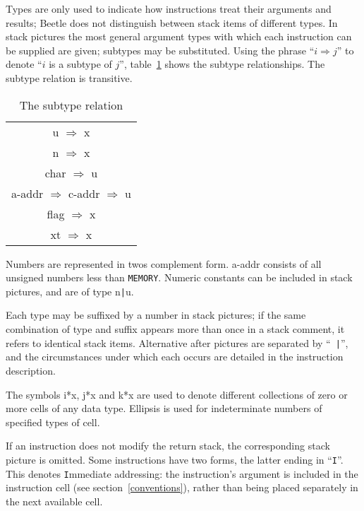 \documentclass{article}
\newcommand{\spic}[1]{{\spfont\setlength{\baselineskip}{\normalbaselineskip}#1\/}}
\begin{document}
Types are only used to indicate how instructions treat their arguments and
results; Beetle does not distinguish between stack items of different types. In
stack pictures the most general argument types with which each instruction can
be supplied are given; subtypes may be substituted. Using the phrase ``$i
\Rightarrow j$'' to denote ``$i$\/ is a subtype of $j$\/'', table~\ref{reltable}
shows the subtype relationships. The subtype relation is transitive.

\begin{table}[htbp]
\begin{center}
\begin{tabular}{|c|} \hline
\spic{u} $\Rightarrow$ \spic{x} \\
\spic{n} $\Rightarrow$ \spic{x} \\
\spic{char} $\Rightarrow$ \spic{u} \\
\spic{a-addr} $\Rightarrow$ \spic{c-addr} $\Rightarrow$ \spic{u} \\
\spic{flag} $\Rightarrow$ \spic{x} \\
\spic{xt} $\Rightarrow$ \spic{x} \\ \hline
\end{tabular}
\end{center}
\vspace{-2mm}
\caption{\label{reltable}The subtype relation}
\end{table}

Numbers are represented in twos complement form. \spic{a-addr} consists of all
unsigned numbers less than {\tt MEMORY}. Numeric constants can be included in
stack pictures, and are of type \spic{n{\tt |}u}.

Each type may be suffixed by a number in stack pictures; if the same combination
of type and suffix appears more than once in a stack comment, it refers to
identical stack items. Alternative \spic{after} pictures are separated by ``{\tt
|}'', and the circumstances under which each occurs are detailed in the
instruction description.

The symbols \spic{i*x}, \spic{j*x} and \spic{k*x} are used to denote different
collections of zero or more cells of any data type. Ellipsis is used for
indeterminate numbers of specified types of cell.

If an instruction does not modify the return stack, the corresponding stack
picture is omitted. Some instructions have two forms, the latter ending in
``{\tt I}''. This denotes {\tt I}mmediate addressing: the instruction's argument
is included in the instruction cell (see section~\ref{conventions}), rather than
being placed separately in the next available cell.
\end{document}
